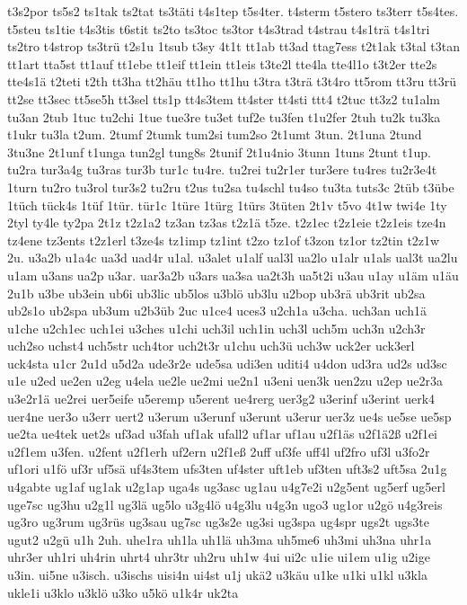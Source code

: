 {t3s2por
ts5s2
ts1tak
ts2tat
ts3täti
t4s1tep
t5s4ter.
t4sterm
t5stero
ts3terr
t5s4tes.
t5steu
ts1tie
t4s3tis
t6stit
ts2to
ts3toc
ts3tor
t4s3trad
t4strau
t4s1trä
t4s1tri
ts2tro
t4strop
ts3trü
t2s1u
1tsub
t3sy
4t1t
tt1ab
tt3ad
ttag7ess
t2t1ak
t3tal
t3tan
tt1art
tta5st
tt1auf
tt1ebe
tt1eif
tt1ein
tt1eis
t3te2l
tte4la
tte4l1o
t3t2er
tte2s
tte4s1ä
t2teti
t2th
tt3ha
tt2häu
tt1ho
tt1hu
t3tra
t3trä
t3t4ro
tt5rom
tt3ru
tt3rü
tt2se
tt3sec
tt5se5h
tt3sel
tts1p
tt4s3tem
tt4ster
tt4sti
ttt4
t2tuc
tt3z2
tu1alm
tu3an
2tub
1tuc
tu2chi
1tue
tue3re
tu3et
tuf2e
tu3fen
t1u2fer
2tuh
tu2k
tu3ka
t1ukr
tu3la
t2um.
2tumf
2tumk
tum2si
tum2so
2t1umt
3tun.
2t1una
2tund
3tu3ne
2t1unf
t1unga
tun2gl
tung8s
2tunif
2t1u4nio
3tunn
1tuns
2tunt
t1up.
tu2ra
tur3a4g
tu3ras
tur3b
tur1c
tu4re.
tu2rei
tu2r1er
tur3ere
tu4res
tu2r3e4t
1turn
tu2ro
tu3rol
tur3s2
tu2ru
t2us
tu2sa
tu4schl
tu4so
tu3ta
tuts3c
2tüb
t3übe
1tüch
tück4s
1tüf
1tür.
tür1c
1türe
1türg
1türs
3tüten
2t1v
t5vo
4t1w
twi4e
1ty
2tyl
ty4le
ty2pa
2t1z
t2z1a2
tz3an
tz3as
t2z1ä
t5ze.
t2z1ec
t2z1eie
t2z1eis
tze4n
tz4ene
tz3ents
t2z1erl
t3ze4s
tz1imp
tz1int
t2zo
tz1of
t3zon
tz1or
tz2tin
t2z1w
2u.
u3a2b
u1a4c
ua3d
uad4r
u1al.
u3alet
u1alf
ual3l
ua2lo
u1alr
u1als
ual3t
ua2lu
u1am
u3ans
ua2p
u3ar.
uar3a2b
u3ars
ua3sa
ua2t3h
ua5t2i
u3au
u1ay
u1äm
u1äu
2u1b
u3be
ub3ein
ub6i
ub3lic
ub5los
u3blö
ub3lu
u2bop
ub3rä
ub3rit
ub2sa
ub2s1o
ub2spa
ub3um
u2b3üb
2uc
u1ce4
uces3
u2ch1a
u3cha.
uch3an
uch1ä
u1che
u2ch1ec
uch1ei
u3ches
u1chi
uch3il
uch1in
uch3l
uch5m
uch3n
u2ch3r
uch2so
uchst4
uch5str
uch4tor
uch2t3r
u1chu
uch3ü
uch3w
uck2er
uck3erl
uck4sta
u1cr
2u1d
u5d2a
ude3r2e
ude5sa
udi3en
uditi4
u4don
ud3ra
ud2s
ud3sc
u1e
u2ed
ue2en
u2eg
u4ela
ue2le
ue2mi
ue2n1
u3eni
uen3k
uen2zu
u2ep
ue2r3a
u3e2r1ä
ue2rei
uer5eife
u5eremp
u5erent
ue4rerg
uer3g2
u3erinf
u3erint
uerk4
uer4ne
uer3o
u3err
uert2
u3erum
u3erunf
u3erunt
u3erur
uer3z
ue4s
ue5se
ue5sp
ue2ta
ue4tek
uet2s
uf3ad
u3fah
uf1ak
ufall2
uf1ar
uf1au
u2f1äs
u2f1ä2ß
u2f1ei
u2f1em
u3fen.
u2fent
u2f1erh
uf2ern
u2f1eß
2uff
uf3fe
uff4l
uf2fro
uf3l
u3fo2r
uf1ori
u1fö
uf3r
uf5sä
uf4s3tem
ufs3ten
uf4ster
uft1eb
uf3ten
uft3s2
uft5sa
2u1g
u4gabte
ug1af
ug1ak
u2g1ap
uga4s
ug3asc
ug1au
u4g7e2i
u2g5ent
ug5erf
ug5erl
uge7sc
ug3hu
u2g1l
ug3lä
ug5lo
u3g4lö
u4g3lu
u4g3n
ugo3
ug1or
u2gö
u4g3reis
ug3ro
ug3rum
ug3rüs
ug3sau
ug7sc
ug3s2e
ug3si
ug3spa
ug4spr
ugs2t
ugs3te
ugut2
u2gü
u1h
2uh.
uhe1ra
uh1la
uh1lä
uh3ma
uh5me6
uh3mi
uh3na
uhr1a
uhr3er
uh1ri
uh4rin
uhrt4
uhr3tr
uh2ru
uh1w
4ui
ui2c
u1ie
ui1em
u1ig
u2ige
u3in.
ui5ne
u3isch.
u3ischs
uisi4n
ui4st
u1j
ukä2
u3käu
u1ke
u1ki
u1kl
u3kla
ukle1i
u3klo
u3klö
u3ko
u5kö
u1k4r
uk2ta
}

